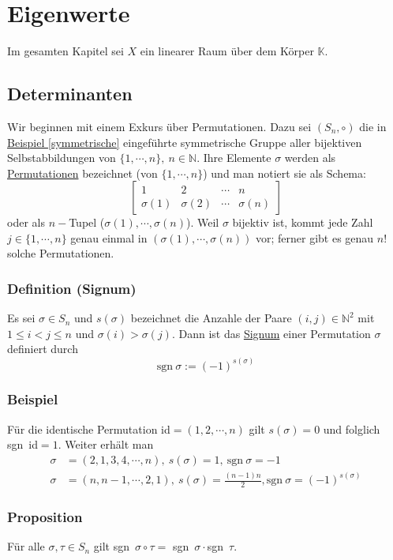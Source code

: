 \section{Eigenwerte}
Im gesamten Kapitel sei $X$ ein linearer Raum über dem Körper $\mathbb{K}$.
\subsection{Determinanten}
Wir beginnen mit einem Exkurs über Permutationen.  Dazu sei $(S_n,\circ )$ die in \hyperref[symmetrische]{Beispiel \ref*{symmetrische}} eingeführte symmetrische Gruppe aller bijektiven Selbstabbildungen von $\{1,\cdots ,n\},\ n\in\mathbb{N}$.  Ihre Elemente $\sigma$ werden als \underline{Permutationen} bezeichnet (von $\{1,\cdots ,n\}$) und man notiert sie als Schema:
\[\begin{bmatrix}1 & 2 & \cdots & n\\ \sigma (1) & \sigma (2) & \cdots & \sigma (n)\end{bmatrix}\]
oder als $n-$Tupel ($\sigma (1),\cdots ,\sigma (n)$).  Weil $\sigma$ bijektiv ist, kommt jede Zahl $j\in\{1,\cdots ,n\}$ genau einmal in $(\sigma (1),\cdots ,\sigma (n))$ vor; ferner gibt es genau $n!$ solche Permutationen.
\subsubsection{Definition (Signum)}
Es sei $\sigma \in S_n$ und $s(\sigma )$ bezeichnet die Anzahle der Paare $(i,j)\in\mathbb{N}^2$ mit $1\leq i<j\leq n$ und $\sigma (i) > \sigma (j)$.  Dann ist das \underline{Signum} einer Permutation $\sigma$ definiert durch
\[\mathrm{sgn~}\sigma := (-1)^{s(\sigma )}\]
\subsubsection{Beispiel}
\label{4.1.2}
Für die identische Permutation id$=(1,2,\cdots ,n)$ gilt $s(\sigma )=0$ und folglich sgn~id$=1$.  Weiter erhält man
\begin{align*}
\sigma &=(2,1,3,4,\cdots ,n),\ s(\sigma )=1,\ \mathrm{sgn~}\sigma =-1\\
\sigma &=(n,n-1,\cdots ,2, 1),\ s(\sigma )=\frac{(n-1)n}{2},\mathrm{sgn~}\sigma =(-1)^{s(\sigma )}
\end{align*}
\subsubsection{Proposition}
Für alle $\sigma ,\tau \in S_n$ gilt sgn~$\sigma \circ \tau =$ sgn~$\sigma\cdot$sgn~$\tau$.

